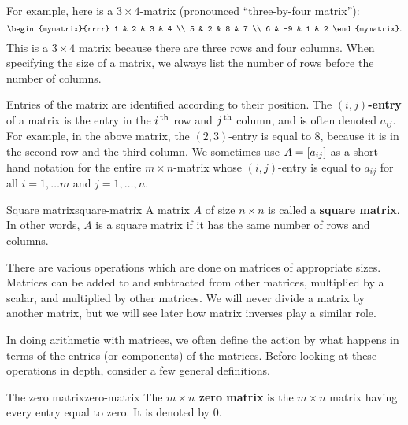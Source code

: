 For example, here is a $3\times 4$-matrix (pronounced ``three-by-four
matrix''):
\begin{equation*}
  \begin{mymatrix}{rrrr}
    1 & 2 & 3 & 4 \\
    5 & 2 & 8 & 7 \\
    6 & -9 & 1 & 2
  \end{mymatrix}.
\end{equation*}
This is a $3\times 4$ matrix because there are three rows and four
columns. When specifying the size of a matrix, we always list the
number of rows before the number of columns.

Entries of the matrix are identified according to their position. The
\textbf{$(i,j)$-entry}%
 of a matrix is
the entry in the $i^{\,\rm th}$ row and $j^{\,\rm th}$ column, and is often denoted
$a_{ij}$. For example, in the above matrix, the $(2,3)$-entry is equal
to $8$, because it is in the second row and the third column.  We
sometimes use $A=\left[a_{ij}\right]$ as a short-hand notation for the entire
$m\times n$-matrix whose $(i,j)$-entry is equal to $a_{ij}$ for all
$i=1,\ldots m$ and $j=1,\ldots,n$.

\begin{definition}{Square matrix}{square-matrix}
  A matrix $A$ of size $n\times n$ is called a \textbf{square
    matrix}.  In other
  words, $A$ is a square matrix if it has the same number of rows and
  columns.
\end{definition}


There are various operations which are done on matrices of appropriate
sizes. Matrices can be added to and subtracted from other matrices,
multiplied by a scalar, and multiplied by other matrices. We will
never divide a matrix by another matrix, but we will see later how
matrix inverses play a similar role.

In doing arithmetic with matrices, we often define the action by what
happens in terms of the entries (or components) of the
matrices. Before looking at these operations in depth, consider a few
general definitions.

\begin{definition}{The zero matrix}{zero-matrix}
The \textbf{$m\times n$ zero matrix} is the $m\times n$ matrix
having every entry equal to zero. It is denoted by $0.$
\end{definition}

